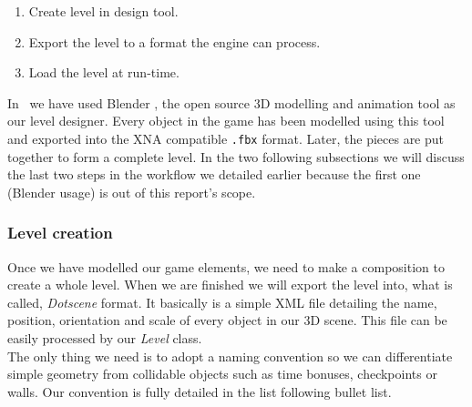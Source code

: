 \begin{enumerate}
	\item Create level in design tool.
	\item Export the level to a format the engine can process.
	\item Load the level at run-time.
\end{enumerate}

In \game\ we have used Blender \cite{hess07}, the open source 3D modelling and animation
tool as our level designer. Every object in the game has been modelled using this tool
and exported into the XNA compatible \texttt{.fbx} format. Later, the pieces are put together
to form a complete level. In the two following subsections we will discuss the last two steps
in the workflow we detailed earlier because the first one (Blender usage) is out of this
report's scope.

\subsubsection{Level creation}

Once we have modelled our game elements, we need to make a composition to
create a whole level. When we are finished we will export the level into, what
is called, \textit{Dotscene} format. It basically is a simple XML file detailing
the name, position, orientation and scale of every object in our 3D scene. This
file can be easily processed by our \textit{Level} class.\\

The only thing we need is to adopt a naming convention so we can differentiate
simple geometry from collidable objects such as time bonuses, checkpoints or walls.
Our convention is fully detailed in the list following bullet list.

